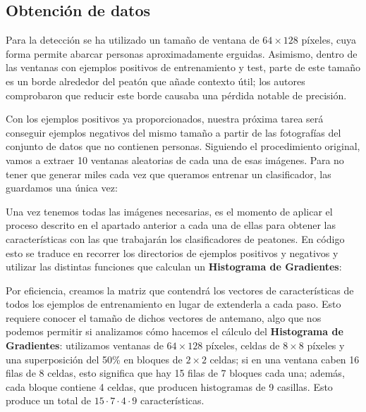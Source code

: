 \documentclass[11pt,a4paper]{article}
\begin{document}
        \subsection{Obtención de datos}

            \par
            Para la detección se ha utilizado un tamaño de ventana de $64\times128$ píxeles, cuya forma permite abarcar personas aproximadamente erguidas. Asimismo, dentro de las ventanas con ejemplos positivos de entrenamiento y test, parte de este tamaño es un borde alrededor del peatón que añade contexto útil; los autores comprobaron que reducir este borde causaba una pérdida notable de precisión.

            \par
            Con los ejemplos positivos ya proporcionados, nuestra próxima tarea será conseguir ejemplos negativos del mismo tamaño a partir de las fotografías del conjunto de datos que no contienen personas. Siguiendo el procedimiento original, vamos a extraer 10 ventanas aleatorias de cada una de esas imágenes. Para no tener que generar miles cada vez que queramos entrenar un clasificador, las guardamos una única vez:


            \par
            Una vez tenemos todas las imágenes necesarias, es el momento de aplicar el proceso descrito en el apartado anterior a cada una de ellas para obtener las características con las que trabajarán los clasificadores de peatones. En código esto se traduce en recorrer los directorios de ejemplos positivos y negativos y utilizar las distintas funciones que calculan un \textbf{Histograma de Gradientes}:


            \par
            Por eficiencia, creamos la matriz que contendrá los vectores de características de todos los ejemplos de entrenamiento en lugar de extenderla a cada paso. Esto requiere conocer el tamaño de dichos vectores de antemano, algo que nos podemos permitir si analizamos cómo hacemos el cálculo del \textbf{Histograma de Gradientes}: utilizamos ventanas de $64\times128$ píxeles, celdas de $8\times8$ píxeles y una superposición del 50\% en bloques de $2\times2$ celdas; si en una ventana caben 16 filas de 8 celdas, esto significa que hay 15 filas de 7 bloques cada una; además, cada bloque contiene 4 celdas, que producen histogramas de 9 casillas. Esto produce un total de $15\cdot7\cdot4\cdot9$ características.
\end{document}
